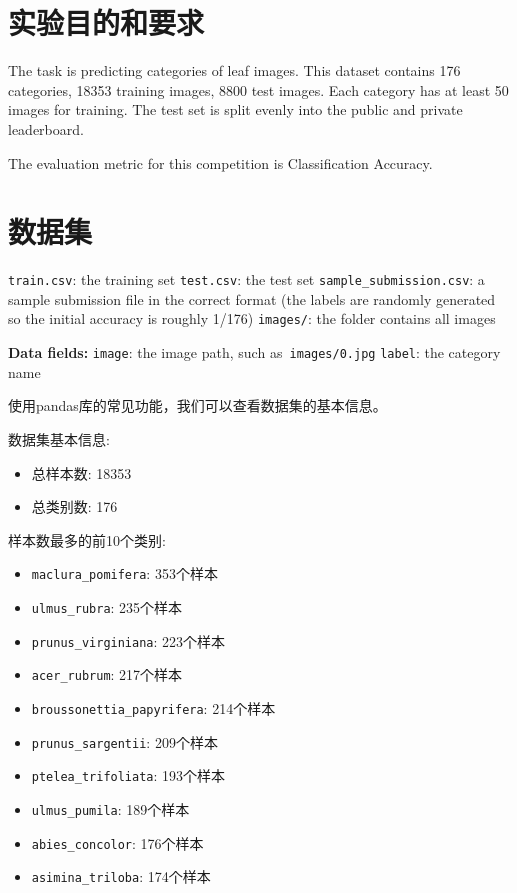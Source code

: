 \documentclass[12pt,a4paper,UTF8]{article}
\begin{document}

\maketoc    %
\section{实验目的和要求}
\begin{problem}
The task is predicting categories of leaf images. This dataset contains 176 categories, 18353 training images, 8800 test images. Each category has at least 50 images for training. The test set is split evenly into the public and private leaderboard.

The evaluation metric for this competition is Classification Accuracy.
\end{problem}



\section{数据集}

\texttt{train.csv}: the training set
\texttt{test.csv}: the test set
\texttt{sample\_submission.csv}: a sample submission file in the correct format (the labels are randomly generated so the initial accuracy is roughly 1/176)
\texttt{images/}: the folder contains all images


\textbf{Data fields:}
\texttt{image}: the image path, such as\texttt{ images/0.jpg}
\texttt{label}: the category name

使用pandas库的常见功能，我们可以查看数据集的基本信息。


数据集基本信息:
\begin{itemize}
    \item 总样本数: 18353
    \item 总类别数: 176
\end{itemize}

样本数最多的前10个类别:
\begin{itemize}
    \item \texttt{maclura\_pomifera}: 353个样本
    \item \texttt{ulmus\_rubra}: 235个样本
    \item \texttt{prunus\_virginiana}: 223个样本
    \item \texttt{acer\_rubrum}: 217个样本
    \item \texttt{broussonettia\_papyrifera}: 214个样本
    \item \texttt{prunus\_sargentii}: 209个样本
    \item \texttt{ptelea\_trifoliata}: 193个样本
    \item \texttt{ulmus\_pumila}: 189个样本
    \item \texttt{abies\_concolor}: 176个样本
    \item \texttt{asimina\_triloba}: 174个样本
\end{itemize}
\end{document}
